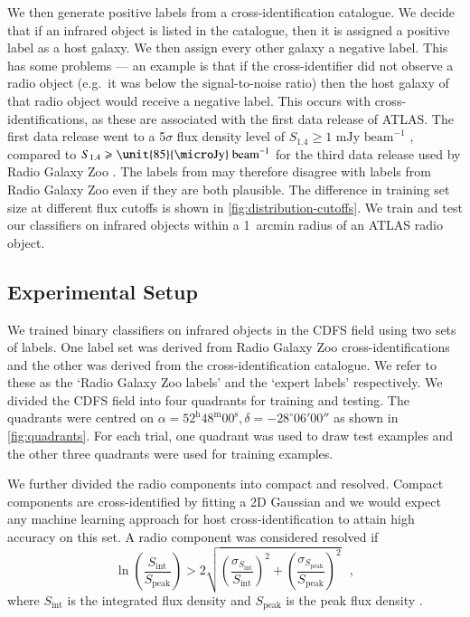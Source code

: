 \documentclass[fleqn,usenatbib,usedcolumn]{mnras}
\newcommand{\jansky}{\text{Jy}}
\begin{document}
    We then generate positive labels from a cross-identification catalogue.
    We decide that if an infrared object is listed in the catalogue, then it
    is assigned a positive label as a host galaxy. We then assign every other galaxy a negative label. This has some problems
    --- an example is that if the cross-identifier did not observe a radio
    object (e.g.~it was below the signal-to-noise ratio) then the host galaxy
    of that radio object would receive a negative label. This occurs with
    \citet{norris06} cross-identifications, as these are associated with the
    first data release of ATLAS. The first data release went to a 5$\sigma$
    flux density level of $S_{1.4} \geq 1 \text{ mJy beam}^{-1}$
    \citep{norris06}, compared to $S_{1.4} \geq \unit{85}{\micro\jansky}\text{
    beam}^{-1}$ for the third data release used by Radio Galaxy Zoo
    \citep{franzen15}. The labels from \citet{norris06} may therefore disagree with labels
    from Radio Galaxy Zoo even if they are both plausible. The difference in
    training set size at different flux cutoffs is shown in
    \autoref{fig:distribution-cutoffs}. We train and test our classifiers on
    infrared objects within a 1~arcmin radius of an ATLAS radio object.

  \subsection{Experimental Setup}
  \label{sec:experimental-setup}

    We trained binary classifiers on infrared objects in the CDFS field using two sets of labels. One label set was derived from
    Radio Galaxy Zoo cross-identifications and the other was derived from the
    \citet{norris06} cross-identification catalogue. We refer to these as the
    `Radio Galaxy Zoo labels' and the `expert labels' respectively. We divided the
    CDFS field into four quadrants for training and testing. The quadrants
    were centred on $\alpha = 52^\text{h}48^\text{m}00^\text{s},
    \delta = -28^\circ{}06'00''$ as shown in \autoref{fig:quadrants}. For
    each trial, one quadrant was used to draw test examples and the other three
    quadrants were used for training examples.

    We further divided the radio components into compact and resolved. Compact
    components are cross-identified by fitting a 2D Gaussian \citep[as
    in][]{norris06} and we would expect any machine learning approach for host
    cross-identification to attain high accuracy on this set. A radio component was
    considered resolved if
    \begin{equation}
        \ln \left(
          \frac{S_{\text{int}}}
               {S_{\text{peak}}}
        \right) > 2\sqrt{\left(
          \frac{\sigma_{S_{\text{int}}}}
               {S_{\text{int}}}
        \right)^2 + \left(
          \frac{\sigma_{S_{\text{peak}}}}
               {S_{\text{peak}}}
        \right)^2}\,\,\,\,,
    \end{equation}%
    where \(S_{\text{int}}\) is the integrated flux density and
    \(S_{\text{peak}}\) is the peak flux density
    \citep[following][]{franzen15}.
\end{document}
